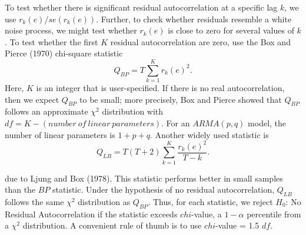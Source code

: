 To test whether there is significant residual autocorrelation at a
specific lag $k$, we use $r_k(e) /se\left( r_k(e) \right)$. Further,
to check whether residuals resemble a white noise process, we might
test whether $r_k(e)$ is close to zero for several values of $k$. To
test whether the first $K$ residual autocorrelation are zero, use
the Box and Pierce (1970) chi-square statistic
\begin{equation*}
Q_{BP} = T \sum_{k=1}^{K} r_k \left( e \right)^2.
\end{equation*}
Here, $K$ is an integer that is user-specified. If there is no real
autocorrelation, then we expect $Q_{BP}$ to be small; more
precisely, Box and Pierce showed that $Q_{BP}$ follows an
approximate $\chi^2$ distribution with
$df=K-(number~of~linear~parameters)$. For an $ARMA(p,q)$ model, the
number of linear parameters is $1+p+q.$ Another widely used
statistic is
\begin{equation*}
Q_{LB}=T(T+2)\sum_{k=1}^{K}\frac{r_k \left( e\right)^2}{T-k}.
\end{equation*}

\noindent due to Ljung and Box (1978). This statistic performs
better in small samples than the $BP$ statistic. Under the
hypothesis of no residual autocorrelation, $Q_{LB}$ follows the same
$\chi^2$ distribution as $Q_{BP}$. Thus, for each statistic, we
reject $H_{0}$: No Residual Autocorrelation if the statistic exceeds
$chi$-value, a $1-\alpha$ percentile from a $\chi^2$ distribution. A
convenient rule of thumb is to use $chi$-value = 1.5
$df.$

\linejed{}


